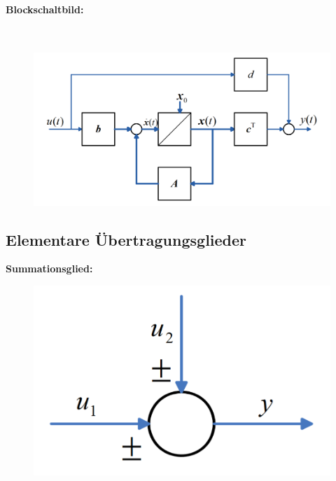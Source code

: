 \documentclass[10pt,a4paper]{article}
\begin{document}
\paragraph*{Blockschaltbild:} ~\\
\begin{figure}[H]
	\includegraphics[width=0.6\columnwidth]{imgs/abb2_12.png}
\end{figure}

\subsection{Elementare Übertragungsglieder}
\textbf{Summationsglied:}
\begin{figure}[H]
	\includegraphics[width=0.2\columnwidth]{imgs/sumglied.png}
\end{figure}
\end{document}

